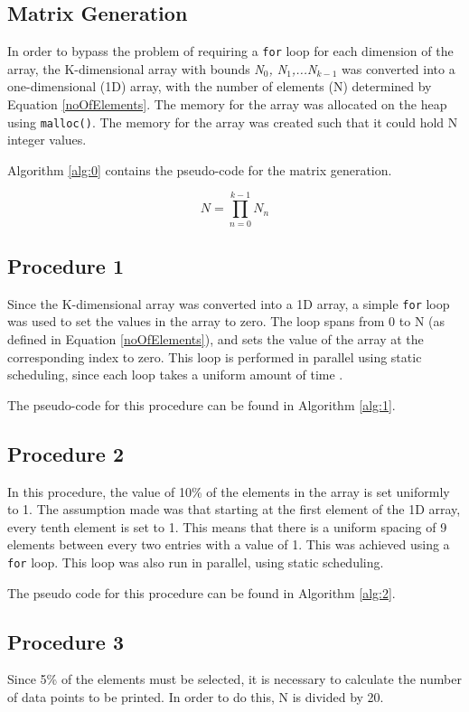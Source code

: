 \documentclass[10pt,twocolumn]{witseiepaper}
\begin{document}
\subsection{Matrix Generation}
In order to bypass the problem of requiring a \texttt{for} loop for each dimension of the array, the K-dimensional array with bounds \textit{N$_0$, N$_1$,...N$_{k-1}$} was converted into a one-dimensional (1D) array, with the number of elements (N) determined by Equation \ref{noOfElements}. The memory for the array was allocated on the heap using \texttt{malloc()}. The memory for the array was created such that it could hold N integer values.

Algorithm \ref{alg:0} contains the pseudo-code for the matrix generation.

\begin{equation}
N = \prod_{n=0}^{k-1}N_{n}
\label{noOfElements}
\end{equation}

\subsection{Procedure 1}
Since the K-dimensional array was converted into a 1D array, a simple \texttt{for} loop was used to set the values in the array to zero. The loop spans from 0 to N (as defined in Equation \ref{noOfElements}), and sets the value of the array at the corresponding index to zero. This loop is performed in parallel using static scheduling, since each loop takes a uniform amount of time \cite{HPC}.

The pseudo-code for this procedure can be found in Algorithm \ref{alg:1}.

\subsection{Procedure 2}
In this procedure, the value of 10\% of the elements in the array is set uniformly to 1. The assumption made was that starting at the first element of the 1D array, every tenth element is set to 1. This means that there is a uniform spacing of 9 elements between every two entries with a value of 1. This was achieved using a \texttt{for} loop. This loop was also run in parallel, using static scheduling. 

The pseudo code for this procedure can be found in Algorithm \ref{alg:2}.

\subsection{Procedure 3}
Since 5\% of the elements must be selected, it is necessary to calculate the number of data points to be printed. In order to do this, N is divided by 20.
\end{document}
